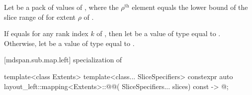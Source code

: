 \pnum
Let  be a pack of values of ,
where the $\rho^\text{th}$ element equals the lower bound
of the  slice range of 
for extent $\rho$ of .

\pnum
If 
equals 
for any rank index $k$ of , then
let  be a value of type  equal to
.
Otherwise,
let  be a value of type  equal to
.

[mdspan.sub.map.left]{ specialization of }

%
\begin{itemdecl}
template<class Extents>
template<class... SliceSpecifiers>
constexpr auto layout_left::mapping<Extents>::@@(
      SliceSpecifiers... slices) const -> @\seebelow@;
\end{itemdecl}

